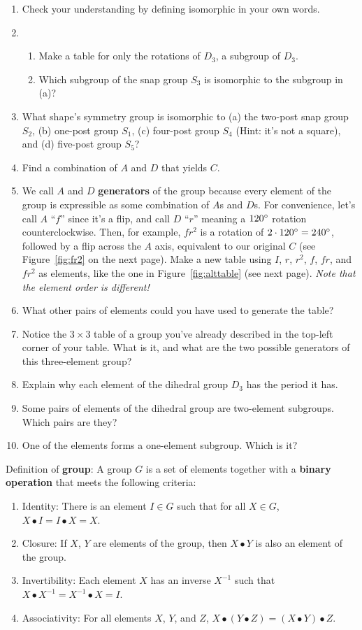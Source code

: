 \documentclass[../gatm.tex]{subfiles}
\begin{document}
\begin{enumerate}
\setcounter{enumi}{\theenumLast}
\item Check your understanding by defining isomorphic in your own words.
\item \begin{enumerate}
\item Make a table for only the rotations of $D_3$, a subgroup of $D_3$.
\item Which subgroup of the snap group $S_3$ is isomorphic to the subgroup in (a)?
\end{enumerate}
\item What shape's symmetry group is isomorphic to (a) the two-post snap group $S_2$, (b) one-post group $S_1$, (c) four-post group $S_4$ (Hint: it's not a square), and (d) five-post group $S_5$?
\item Find a combination of $A$ and $D$ that yields $C$.
\item We call $A$ and $D$ \textbf{generators} of the group because every element of the group is expressible as some combination of $A$s and $D$s. For convenience, let's call $A$ ``$f$'' since it's a flip, and call $D$ ``$r$'' meaning a $120^\circ$ rotation counterclockwise. Then, for example, $fr^2$ is a rotation of $2\cdot 120^\circ = 240^\circ$, followed by a flip across the $A$ axis, equivalent to our original $C$ (see Figure~\ref{fig:fr2} on the next page). Make a new table using $I$, $r$, $r^2$, $f$, $fr$, and $fr^2$ as elements, like the one in Figure~\ref{fig:alttable} (see next page). \textit{Note that the element order is different!}
\item What other pairs of elements could you have used to generate the table?
\item Notice the $3\times 3$ table of a group you've already described in the top-left corner of your table. What is it, and what are the two possible generators of this three-element group?
\item Explain why each element of the dihedral group $D_3$ has the period it has.
\item Some pairs of elements of the dihedral group are two-element subgroups. Which pairs are they?
\item One of the elements forms a one-element subgroup. Which is it?
\setcounter{enumLast}{\theenumi}
\end{enumerate}
Definition of \textbf{group}: A group $G$ is a set of elements together with a \textbf{binary operation} that meets the following criteria:
\begin{enumerate}[label=(\alph*)]
\item Identity: There is an element $I\in G$ such that for all $X\in G$, $X\bullet I = I\bullet X = X$.
\item Closure: If $X$, $Y$ are elements of the group, then $X\bullet Y$ is also an element of the group.
\item Invertibility: Each element $X$ has an inverse $X^{-1}$ such that $X\bullet X^{-1} = X^{-1}\bullet X = I$.
\item Associativity: For all elements $X$, $Y$, and $Z$, $X\bullet (Y\bullet Z) = (X\bullet Y) \bullet Z$.
\end{enumerate}
\end{document}
